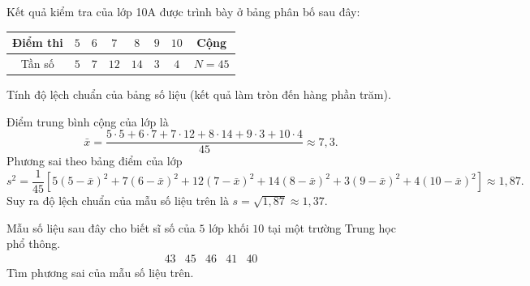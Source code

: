 \begin{bt}%
	Kết quả kiểm tra của lớp 10A được trình bày ở bảng phân bố sau đây:
	\begin{center}
		\begin{tabular}{|c|c|c|c|c|c|c|c|}
		\hline Điểm thi & $5$ & $6$ & $7$ & $8$ & $9$ & $10$ & Cộng \\
		\hline Tần số & $5$ & $7$ & $12$ & $14$ & $3$ & $4$ & $N=45$ \\
		\hline
	\end{tabular}
	\end{center}
	Tính độ lệch chuẩn của bảng số liệu (kết quả làm tròn đến hàng phần trăm).
	
	\loigiai
	{
	Điểm trung bình cộng của lớp là $$\bar{x}=\dfrac{5 \cdot 5+6 \cdot 7+7 \cdot 12+8 \cdot 14+9 \cdot 3+10 \cdot 4}{45} \approx 7{,}3.$$
	Phương sai theo bảng điểm của lớp
	$$
	s^2=\dfrac{1}{45}\left[5(5-\bar{x})^2+7(6-\bar{x})^2+12(7-\bar{x})^2+14(8-\bar{x})^2+3(9-\bar{x})^2+4(10-\bar{x})^2\right] \approx 1{,}87.
	$$
	Suy ra độ lệch chuẩn của mẫu số liệu trên là $s=\sqrt{1{,}87} \approx 1{,}37$.	
	}
\end{bt}

\begin{bt}%
	Mẫu số liệu sau đây cho biết sĩ số của $5$ lớp khối $10$ tại một trường Trung học phổ thông.
	$$\begin{array}{ccccc} 43 & 45 & 46 & 41 & 40 \end{array}$$
	Tìm phương sai của mẫu số liệu trên.
\end{bt}


